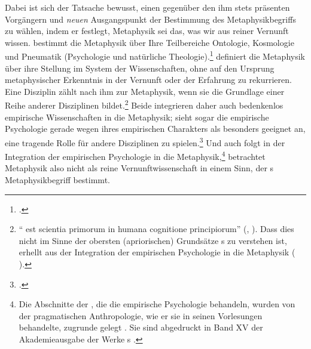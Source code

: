 \begin{nummerierung}
Dabei ist sich  der Tatsache bewusst, einen gegenüber den ihm stets präsenten
Vorgängern  und
 \textit{neuen}
Ausgangspunkt der Bestimmung des Metaphysikbegriffs zu wählen, indem er
festlegt, Metaphysik sei das, was wir aus reiner Vernunft
wissen. 
bestimmt die Metaphysik über Ihre Teilbereiche Ontologie, Kosmologie und
Pneumatik (Psychologie und natürliche
Theologie).\footcite[Vgl.][\S~79]{Wolff:Discursuspraeliminarisdephilosophiaingenere1996}
 definiert die Metaphysik
über ihre Stellung im System der Wissenschaften, ohne auf den Ursprung
metaphysischer Erkenntnis in der Vernunft oder der Erfahrung zu rekurrieren.
Eine Disziplin zählt nach ihm zur Metaphysik, wenn sie die Grundlage einer
Reihe anderer Disziplinen
bildet.\footnote{\label{Anmerkung:SchulmetaphysikMitEmpirischerPsychologie}\enquote{
est scientia primorum in humana cognitione principiorum}
\mkbibparens{\cite[][\S~1]{Baumgarten:Metaphysica---Metaphysik2011},
\cite[][XVII: 23.16]{Kant:GesammelteWerke1900ff.}}. Dass dies nicht im Sinne
der obersten (apriorischen) Grundsätze s zu verstehen ist,
erhellt aus der Integration der empirischen Psychologie in die Metaphysik
\mkbibparens{\cite[vgl.][\S\S~502\,f.,]{Baumgarten:Metaphysica---Metaphysik2011}
\cite[][XVII: 130.17--22]{Kant:GesammelteWerke1900ff.}}.} Beide integrieren
daher auch bedenkenlos empirische Wissenschaften in die
Metaphysik; 
sieht sogar die empirische Psychologie gerade wegen ihres empirischen Charakters als
besonders geeignet an, eine tragende Rolle für andere Disziplinen zu
spielen.\footnote{\cite[Vgl.][\S~112]{Wolff:Discursuspraeliminarisdephilosophiaingenere1996}.}
Und auch  folgt
 in der
Integration der empirischen Psychologie in die Metaphysik,\footnote{Die
Abschnitte der , die die empirische Psychologie behandeln,
wurden von  der pragmatischen Anthropologie, wie er sie in
seinen Vorlesungen behandelte, zugrunde gelegt
\parencite[vgl.][\pno~54\,f.]{Falduto:TheFacultiesoftheHumanMindandtheCaseofMoralFeelinginKantsPhilosophy2014}.
Sie sind abgedruckt in Band XV der Akademieausgabe der Werke
s \parencite[siehe][XV:
5--54]{Kant:GesammelteWerke1900ff.}.} betrachtet Metaphysik also nicht als reine
Vernunftwissenschaft in einem Sinn, der s Metaphysikbegriff
bestimmt.


\end{nummerierung}
